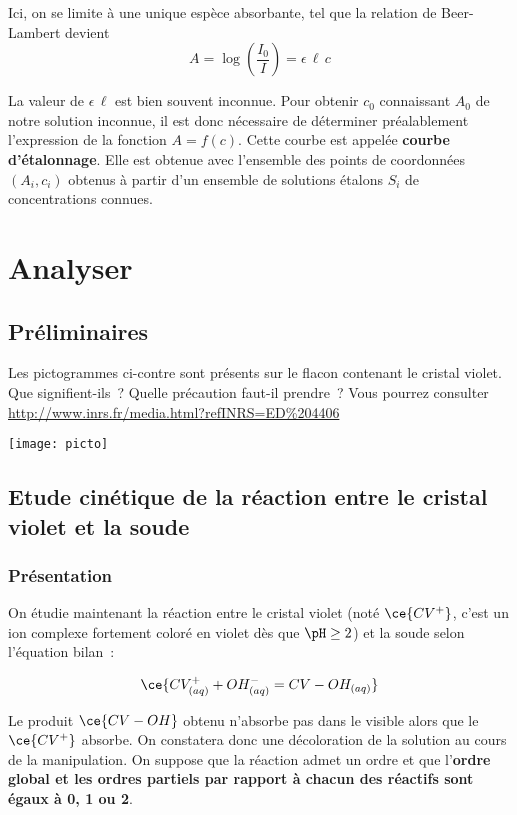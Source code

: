 \documentclass[a4paper, 11pt, final, garamond]{book}
\begin{document}
Ici, on se limite à une unique espèce absorbante, tel que la relation de
Beer-Lambert devient
\[\boxed{A = \log\left(\frac{I_0}{I}\right) = \epsilon \, \ell \, c}\]

La valeur de $\epsilon \, \ell$ est bien souvent inconnue. Pour
obtenir $c_0$ connaissant $A_0$ de notre solution inconnue, il est donc
nécessaire de déterminer préalablement l'expression de la fonction $A=f(c)$.
Cette courbe est appelée \textbf{courbe d'étalonnage}. Elle est obtenue avec
l'ensemble des points de coordonnées $(A_i, c_i)$ obtenus à partir d'un ensemble
de solutions étalons $S_i$ de concentrations connues.

\section{Analyser}
\subsection{Préliminaires}

\begin{minipage}{0.7\linewidth}
    Les pictogrammes ci-contre sont présents sur le flacon contenant le cristal
    violet. Que signifient-ils~? Quelle précaution faut-il prendre~?
    Vous pourrez consulter \url{http://www.inrs.fr/media.html?refINRS=ED%204406}
\end{minipage}
\begin{minipage}{0.3\linewidth}
    \begin{center}
        \texttt{[image: picto]}
    \end{center}
\end{minipage}

\subsection{Etude cinétique de la réaction entre le cristal violet et la soude}

\subsubsection{Présentation}

On étudie maintenant la réaction entre le cristal violet (noté $\ce{CV^+}$,
c'est un ion complexe fortement coloré en violet dès que $\pH \geq 2$) et la
soude selon l'équation bilan~: 

\[\ce{CV^+_{(aq)} + OH^-_{(aq)} = CV-OH_{(aq)}}\]

Le produit $\ce{CV-OH}$ obtenu n'absorbe pas dans le visible alors que le
$\ce{CV^+}$ absorbe. On constatera donc une décoloration de la solution au cours
de la manipulation. On suppose que la réaction admet un ordre et que
l'\textbf{ordre global et les ordres partiels par rapport à chacun des réactifs
sont égaux à 0, 1 ou 2}.
\end{document}
